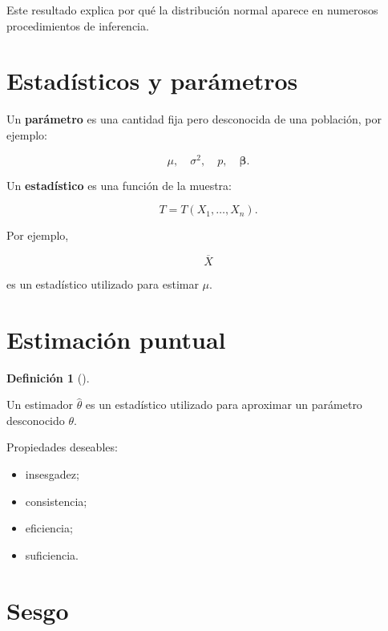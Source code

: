\documentclass[
  spanish,
  10.5pt,
  letterpaper,
  DIV=11,
  numbers=noendperiod,
  oneside,
  open=any]{scrreprt}
\providecommand{\tightlist}{%
  \setlength{\itemsep}{0pt}\setlength{\parskip}{0pt}}
\theoremstyle{definition}
\newtheorem{definition}{Definición}[chapter]
\theoremstyle{definition}
\theoremstyle{plain}
\theoremstyle{remark}
\begin{document}
Este resultado explica por qué la distribución normal aparece en
numerosos procedimientos de inferencia.

\section*{Estadísticos y
parámetros}\label{estaduxedsticos-y-paruxe1metros}


Un \textbf{parámetro} es una cantidad fija pero desconocida de una
población, por ejemplo:

\[
\mu,\quad \sigma^2,\quad p,\quad \boldsymbol{\beta}.
\]

Un \textbf{estadístico} es una función de la muestra:

\[
T=T(X_1,\ldots,X_n).
\]

Por ejemplo,

\[
\overline{X}
\]

es un estadístico utilizado para estimar \(\mu\).

\section*{Estimación puntual}\label{estimaciuxf3n-puntual}


\begin{definition}[]\protect\hypertarget{def-estimador}{}\label{def-estimador}

Un estimador \(\widehat{\theta}\) es un estadístico utilizado para
aproximar un parámetro desconocido \(\theta\).

\end{definition}

Propiedades deseables:

\begin{itemize}
\tightlist
\item
  insesgadez;
\item
  consistencia;
\item
  eficiencia;
\item
  suficiencia.
\end{itemize}

\section*{Sesgo}\label{sesgo}
\end{document}
